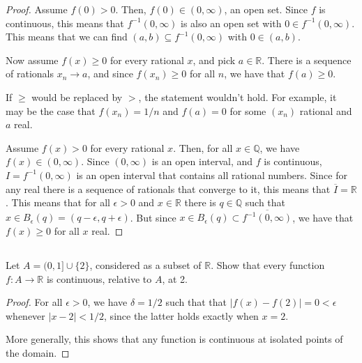 \begin{proof}
Assume $f(0) > 0$. Then, $f(0) \in (0, \infty)$, an open set. Since $f$ is continuous, this means that $f^{-1}(0,\infty)$ is also an open set with $0 \in f^{-1}(0,\infty)$. This means that we can find $(a,b) \subseteq f^{-1}(0,\infty) $ with $0 \in (a,b)$. 


\vspace{1em}

Now assume $f(x) \geq 0$ for every rational $x$, and pick $a \in \mathbb{R}$. There is a sequence of rationals $x_n \rightarrow a$, and since $f(x_n) \geq 0$ for all $n$, we have that $f(a) \geq 0$. 

If $\geq$ would be replaced by $>$, the statement wouldn't hold. For example, it may be the case that $f(x_n) = 1/n$ and $f(a) = 0$ for some $(x_n)$ rational and $a$ real.

\vspace{1em}

Assume $f(x) > 0$ for every rational $x$. Then, for all $x \in \mathbb{Q}$, we have $f(x) \in (0, \infty)$. Since $(0, \infty)$ is an open interval, and $f$ is continuous, $I = f^{-1}(0, \infty)$ is an open interval that contains all rational numbers. Since for any real there is a sequence of rationals that converge to it, this means that $\overline{I} = \mathbb{R}$. This means that for all $\epsilon > 0$ and $x \in \mathbb{R}$ there is $q \in \mathbb{Q}$ such that $x \in B_\epsilon(q) = (q-\epsilon, q+\epsilon)$. But since $x \in B_\epsilon(q) \subset \overline{f^{-1}(0, \infty)}$, we have that $f(x) \geq 0$ for all $x$ real.

\end{proof}




\subsection{} Let $A = (0, 1] \cup \{2\}$, considered as a subset of $\mathbb{R}$. Show that every function $f : A \rightarrow \mathbb{R}$ is continuous, relative to $A$, at 2. 

\begin{proof}
For all $\epsilon > 0$, we have $\delta = 1/2$ such that that $|f(x) - f(2)| = 0 < \epsilon$ whenever $|x-2| < 1/2$, since the latter holds exactly when $x=2$.

More generally, this shows that any function is continuous at isolated points of the domain.
\end{proof}


